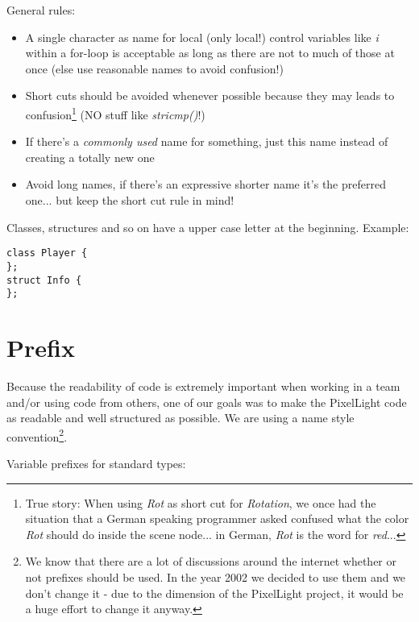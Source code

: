General rules:

\begin{itemize}
\item A single character as name for local (only local!) control variables like \emph{i} within a for-loop is acceptable as long as there are not to much of those at once (else use reasonable names to avoid confusion!)
\item Short cuts should be avoided whenever possible because they may leads to confusion\footnote{True story: When using \emph{Rot} as short cut for \emph{Rotation}, we once had the situation that a German speaking programmer asked confused what the color \emph{Rot} should do inside the scene node... in German, \emph{Rot} is the word for \emph{red}...} (NO stuff like \emph{stricmp()}!)
\item If there's a \emph{commonly used} name for something, just this name instead of creating a totally new one
\item Avoid long names, if there's an expressive shorter name it's the preferred one... but keep the short cut rule in mind!
\end{itemize}

Classes, structures and so on have a upper case letter at the beginning. Example:

\begin{lstlisting}[caption=Name convention]
class Player {
};
struct Info {
};
\end{lstlisting}




\section{Prefix}
Because the readability of code is extremely important when working in a team and/or using code from others, one of our goals was to make the PixelLight code as readable and well structured as possible. We are using a name style convention\footnote{We know that there are a lot of discussions around the internet whether or not prefixes should be used. In the year 2002 we decided to use them and we don't change it - due to the dimension of the PixelLight project, it would be a huge effort to change it anyway.}.

Variable prefixes for standard types:


